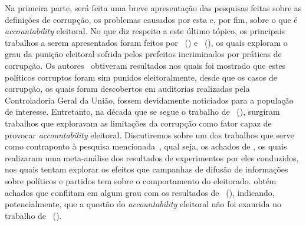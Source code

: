\documentclass[
	12pt,				%
	openright,			%
	twoside,			%
	a4paper,			%
	openany,
	english,			%
	brazil				%
	]{abntex2}
\begin{document}
Na primeira parte, será feita uma breve apresentação das pesquisas feitas sobre as definições de corrupção, os problemas causados por esta e, por fim, sobre o que é \textit{accountability} eleitoral. No que diz respeito a este último tópico, os principais trabalhos a serem apresentados foram feitos por ~(\citeyear{ferraz2008exposing}) e ~(\citeyear{Avis2018Oct}), os quais exploram o grau da punição eleitoral sofrida pelos prefeitos incriminados por práticas de corrupção. Os autores~\cite{ferraz2008exposing, Avis2018Oct} obtiveram resultados nos quais foi mostrado que estes políticos corruptos foram sim punidos eleitoralmente, desde que os casos de corrupção, os quais foram descobertos em auditorias realizadas pela Controladoria Geral da União, fossem devidamente noticiados para a população de interesse. Entretanto, na década que se segue o trabalho de ~(\citeyear{ferraz2008exposing}), surgiram trabalhos que exploravam as limitações da corrupção como fator capaz de provocar \textit{accountability} eleitoral. Discutiremos sobre um dos trabalhos que serve como contraponto à pesquisa mencionada~\cite{ferraz2008exposing}, qual seja, os achados de \cite{dunning2019voter}, os quais realizaram uma meta-análise dos resultados de experimentos por eles conduzidos, nos quais tentam explorar os efeitos que campanhas de difusão de informações sobre políticos e partidos tem sobre o comportamento do eleitorado. \cite{dunning2019voter} obtém achados que conflitam em algum grau com os resultados de ~(\citeyear{ferraz2008exposing}), indicando, potencialmente, que a questão do \textit{accountability} eleitoral não foi exaurida no trabalho de ~(\citeyear{ferraz2008exposing}).

\end{document}
